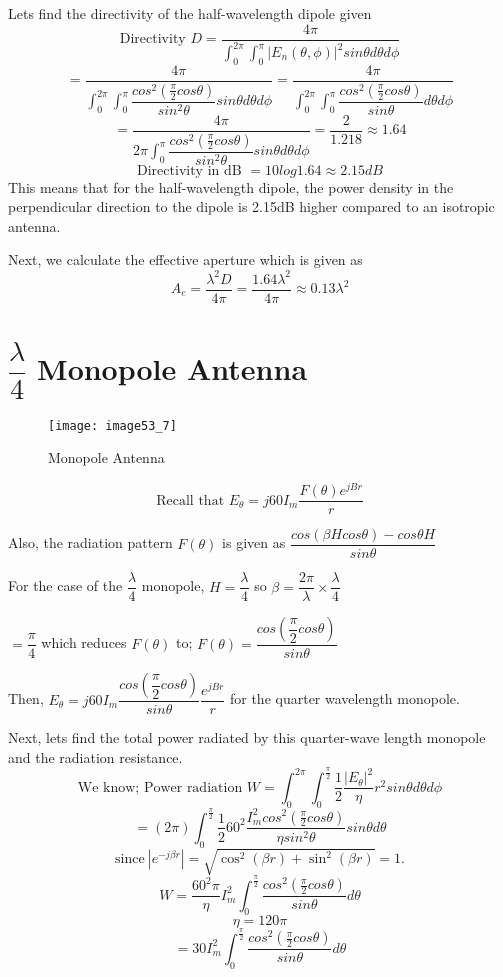 Lets find the directivity of the half-wavelength dipole given 
\[ \text{Directivity }D = \dfrac{4\pi}{\int_{0}^{2\pi}\int_{0}^{\pi}|E_n(\theta ,\phi)|^2sin\theta d\theta d\phi} \]
\[ = \dfrac{4\pi}{\int_{0}^{2\pi}\int_{0}^{\pi}\dfrac{cos^2(\frac{\pi}{2}cos\theta)}{sin^2\theta}sin\theta d\theta d\phi} = \dfrac{4\pi}{\int_{0}^{2\pi}\int_{0}^{\pi}\dfrac{cos^2(\frac{\pi}{2}cos\theta)}{sin\theta} d\theta d\phi} \]
\[ = \dfrac{4\pi}{2\pi\int_{0}^{\pi}\dfrac{cos^2(\frac{\pi}{2}cos\theta)}{sin^2\theta}sin\theta d\theta d\phi} = \dfrac{2}{1.218} \approx 1.64 \]
\[ \text{Directivity in dB } = 10log1.64 \approx 2.15dB \]
This means that for the half-wavelength dipole, the power density in the perpendicular direction to the dipole is 2.15dB higher compared to an isotropic antenna.

Next, we calculate the effective aperture which is given as 
\[A_e = \dfrac{\lambda^2 D}{4\pi} = \dfrac{1.64\lambda^2}{4\pi} \approx 0.13\lambda^2 \]

\section{$\dfrac{\lambda}{4}$ Monopole Antenna}
\begin{figure}
	\centering
	\texttt{[image: image53\_7]}
	\caption{Monopole Antenna}
	\label{fig:fig7}
\end{figure}
\begin{equation*}
\text{Recall that }E_\theta = j60I_m \frac{F(\theta)e^{jBr}}{r}
\end{equation*}
\begin{center}
	Also, the radiation pattern $F(\theta)$ is given as $\dfrac{cos(\beta H cos\theta) - cos\theta H}{sin \theta}$
	
	For the case of the $\dfrac{\lambda}{4}$ monopole, $H = \dfrac{\lambda}{4}$ so $\beta = \dfrac{2\pi}{\lambda} \times \dfrac{\lambda}{4}$
	
	$ = \dfrac{\pi}{4} $ which reduces $F(\theta)$ to; $F(\theta) = \dfrac{cos (\dfrac{\pi}{2} cos\theta)}{sin\theta}$
	
	Then, $E_\theta = j60I_m \dfrac{cos (\dfrac{\pi}{2} cos\theta)}{sin\theta} \dfrac{e^{jBr}}{r}$ for the quarter wavelength monopole.
\end{center}
Next, lets find the total power radiated by this quarter-wave length monopole and the radiation resistance. 
\[ \text{We know; Power radiation } W = \int_0^{2\pi}\int_{0}^{\frac{\pi}{2}} \frac{1}{2}\frac{|E_\theta|^2}{\eta}r^2sin\theta d\theta d\phi \]
\[ = (2\pi)\int_{0}^{\frac{\pi}{2}} \frac{1}{2} 60^2 \frac{I_m^2cos^2(\frac{\pi}{2}cos\theta)}{\eta sin^2\theta}sin\theta d\theta \]
$$\text{since}\ |e^{-j\beta r}| = \sqrt{\cos^2(\beta r) + \sin^2(\beta r)} = 1.$$
\[ W = \frac{60^2\pi}{\eta} I_m^2 \int_{0}^{\frac{\pi}{2}} \frac{cos^2(\frac{\pi}{2}cos\theta)}{sin\theta}d\theta \]
\[ \eta = 120\pi \]
\[ = 30I_m^2 \int_{0}^{\frac{\pi}{2}}\dfrac{cos^2(\frac{\pi}{2}cos\theta)}{sin\theta}d\theta \]

